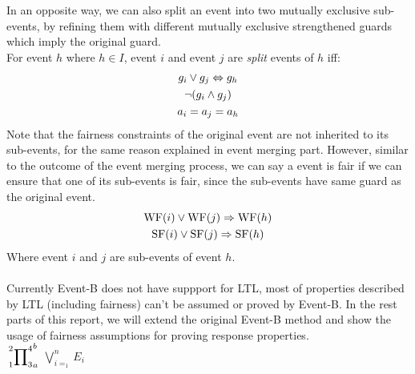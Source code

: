 In an opposite way, we can also split an event into two mutually exclusive sub-events, by refining them with different mutually exclusive strengthened guards which imply the original guard. \\
For event $h$ where $h \in I$, event $i$ and event $j$ are \emph{split} events of $h$ iff:
\begin{gather*} 
g_i \vee g_j \Leftrightarrow g_h\\
\neg(g_i\wedge g_j)\\
a_i = a_j = a_h
\end{gather*}
Note that the fairness constraints of the original event are not inherited to its sub-events, for the same reason explained in event merging part.
However, similar to the outcome of the event merging process, we can say a event is fair if we can ensure that one of its sub-events is fair, since the sub-events have same guard as the original event.
\begin{gather*} 
  \mathrm{WF}(i) \vee \mathrm{WF}(j) \Rightarrow  \mathrm{WF}(h)\\
  \mathrm{SF}(i) \vee \mathrm{SF}(j) \Rightarrow \mathrm{SF}(h)
\end{gather*}
Where event $i$ and $j$ are sub-events of event $h$.\\\\
Currently Event-B does not have suppport for LTL, most of properties described by LTL (including fairness) can't be assumed or proved by Event-B. In the rest parts of this report, we will extend the original Event-B method and show the usage of fairness assumptions for proving response properties.\\


 	$\sideset{_1^2}{_3^4}\prod_a^b$
 	$\bigvee_{i=_1}^n E_i$

